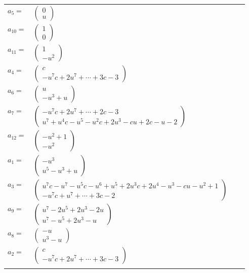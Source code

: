 \documentclass[1p]{elsarticle_modified}
\theoremstyle{definition}
\begin{document}
\begin{tabular}{m{7pt} m{180pt} m{7pt} m{180pt} }
\flushright $a_{5}=$&$\begin{pmatrix}0\\u\end{pmatrix}$ \\
\flushright $a_{10}=$&$\begin{pmatrix}1\\0\end{pmatrix}$ \\
\flushright $a_{11}=$&$\begin{pmatrix}1\\- u^2\end{pmatrix}$ \\
\flushright $a_{4}=$&$\begin{pmatrix}c\\- u^7 c+2 u^7+\cdots+3 c-3\end{pmatrix}$ \\
\flushright $a_{6}=$&$\begin{pmatrix}u\\- u^3+u\end{pmatrix}$ \\
\flushright $a_{7}=$&$\begin{pmatrix}- u^7 c+2 u^7+\cdots+2 c-3\\u^7+u^4 c- u^5- u^2 c+2 u^3- c u+2 c- u-2\end{pmatrix}$ \\
\flushright $a_{12}=$&$\begin{pmatrix}- u^2+1\\- u^2\end{pmatrix}$ \\
\flushright $a_{1}=$&$\begin{pmatrix}- u^3\\u^5- u^3+u\end{pmatrix}$ \\
\flushright $a_{3}=$&$\begin{pmatrix}u^7 c- u^7- u^5 c- u^6+u^5+2 u^3 c+2 u^4- u^3- c u- u^2+1\\- u^7 c+u^7+\cdots+3 c-2\end{pmatrix}$ \\
\flushright $a_{9}=$&$\begin{pmatrix}u^7-2 u^5+2 u^3-2 u\\u^7- u^5+2 u^3- u\end{pmatrix}$ \\
\flushright $a_{8}=$&$\begin{pmatrix}- u\\u^3- u\end{pmatrix}$ \\
\flushright $a_{2}=$&$\begin{pmatrix}c\\- u^7 c+2 u^7+\cdots+3 c-3\end{pmatrix}$\\&\end{tabular}
\end{document}
